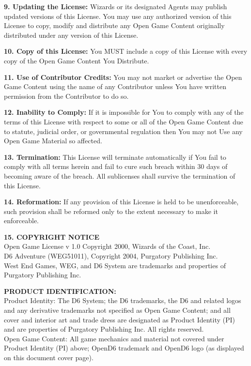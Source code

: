 \documentclass[10pt, a4paper, twoside]{book}
\begin{document}
{	\textbf{9. Updating the License:} Wizards or its designated Agents may publish updated versions of this License. You may use any authorized version of this License to copy, modify and distribute any Open Game Content originally distributed under any version of this License. \par 
	\textbf{10. Copy of this License:} You MUST include a copy of this License with every copy of the Open Game Content You Distribute. \par 
	\textbf{11. Use of Contributor Credits:} You may not market or advertise the Open Game Content using the name of any Contributor unless You have written permission from the Contributor to do so. \par
	\textbf{12. Inability to Comply:} If it is impossible for You to comply with any of the terms of this License with respect to some or all of the Open Game Content due to statute, judicial order, or governmental regulation then You may not Use any Open Game Material so affected. \par 
	\textbf{13. Termination:} This License will terminate automatically if You fail to comply with all terms herein and fail to cure such breach within 30 days of becoming aware of the breach. All sublicenses shall survive the termination of this License. \par 
	\textbf{14. Reformation:} If any provision of this License is held to be unenforceable, such provision shall be reformed only to the extent necessary to make it enforceable. \par 
	\textbf{15. COPYRIGHT NOTICE} \\ Open Game License v 1.0 Copyright 2000,  Wizards of the Coast, Inc. \\ D6 Adventure (WEG51011), Copyright 2004, Purgatory Publishing Inc. \\ West End Games, WEG, and D6 System are trademarks and properties of Purgatory Publishing Inc. \par 
	\textbf{PRODUCT IDENTIFICATION:} \\ Product Identity: The D6 System; the D6 trademarks, the D6 and related logos and any derivative trademarks not specified as Open Game Content; and all cover and interior art and trade dress are designated as Product Identity (PI) and are properties of Purgatory Publishing Inc. All rights reserved. \\ Open Game Content: All game mechanics and material not covered under Product Identity (PI) above; OpenD6 trademark and OpenD6 logo (as displayed on this document cover page). \par}
\end{document}
